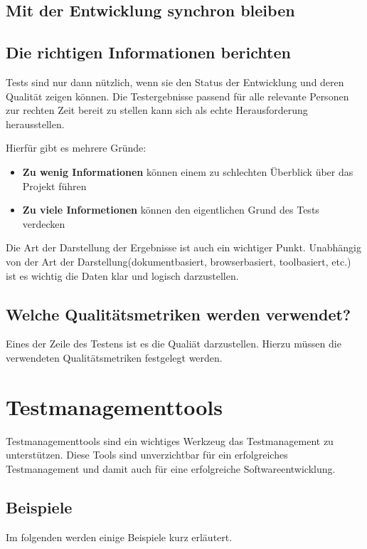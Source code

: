 \section{Mit der Entwicklung synchron bleiben}

\section{Die richtigen Informationen berichten}
Tests sind nur dann nützlich, wenn sie den Status der Entwicklung und deren Qualit\"at zeigen k\"onnen. Die Testergebnisse passend f\"ur alle relevante Personen zur rechten Zeit bereit zu stellen kann sich als echte Herausforderung herausstellen. 

Hierf\"ur gibt es mehrere Gr\"unde:
\begin{itemize}
	\item \textbf{Zu wenig Informationen} k\"onnen einem zu schlechten \"Uberblick \"uber das Projekt f\"uhren
	\item \textbf{Zu viele Informetionen} k\"onnen den eigentlichen Grund des Tests verdecken
\end{itemize}

Die Art der Darstellung der Ergebnisse ist auch ein wichtiger Punkt. Unabh\"angig von der Art der Darstellung(dokumentbasiert, browserbasiert, toolbasiert, etc.) ist es wichtig die Daten klar und logisch darzustellen.

\section{Welche Qualit\"atsmetriken werden verwendet?}
Eines der Zeile des Testens ist es die Quali\"at darzustellen. Hierzu m\"ussen die verwendeten Qualit\"atsmetriken festgelegt werden.


\chapter{Testmanagementtools}
Testmanagementtools sind ein wichtiges Werkzeug das Testmanagement zu unterst\"utzen. Diese Tools sind unverzichtbar f\"ur ein erfolgreiches Testmanagement und damit auch f\"ur eine erfolgreiche Softwareentwicklung.

\section{Beispiele}
Im folgenden werden einige Beispiele kurz erl\"autert.


